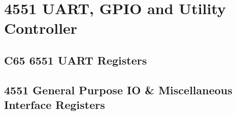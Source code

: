 \chapter{4551 UART, GPIO and Utility Controller}

\section{C65 6551 UART Registers}



\section{4551 General Purpose IO \& Miscellaneous Interface Registers}


